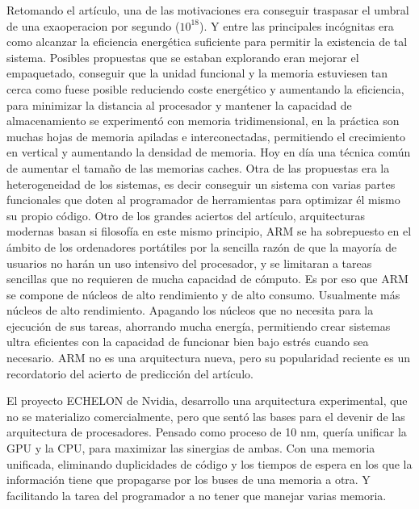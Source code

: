 \documentclass[12pt,a4paper,twoside,openright]{report}
\begin{document}
Retomando el artículo, una de las motivaciones era conseguir traspasar el umbral de una exaoperacion por segundo ($10^{18}$). Y entre las principales incógnitas era como alcanzar la eficiencia energética suficiente para permitir la existencia de tal sistema.
Posibles propuestas que se estaban explorando eran mejorar el empaquetado, conseguir que la unidad funcional y la memoria estuviesen tan cerca como fuese posible reduciendo coste energético y aumentando la eficiencia, para minimizar la distancia al procesador y mantener la capacidad de almacenamiento se experimentó con memoria tridimensional, en la práctica son muchas hojas de memoria apiladas e interconectadas, permitiendo el crecimiento en vertical y aumentando la densidad de memoria. Hoy en día una técnica común de aumentar el tamaño de las memorias caches.
Otra de las propuestas era la heterogeneidad de los sistemas, es decir conseguir un sistema con varias partes funcionales que doten al programador de herramientas para optimizar él mismo su propio código. Otro de los grandes aciertos del artículo, arquitecturas modernas basan si filosofía en este mismo principio, ARM se ha sobrepuesto en el ámbito de los ordenadores portátiles por la sencilla razón de que la mayoría de usuarios no harán un uso intensivo del procesador, y se limitaran a tareas sencillas que no requieren de mucha capacidad de cómputo. Es por eso que ARM se compone de núcleos de alto rendimiento y de alto consumo. Usualmente más núcleos de alto rendimiento. Apagando los núcleos que no necesita para la ejecución de sus tareas, ahorrando mucha energía, permitiendo crear sistemas ultra eficientes con la capacidad de funcionar bien bajo estrés cuando sea necesario. ARM no es una arquitectura nueva, pero su popularidad reciente es un recordatorio del acierto de predicción del artículo.

\medskip

El proyecto ECHELON de Nvidia, desarrollo una arquitectura experimental, que no se materializo comercialmente, pero que sentó las bases para el devenir de las arquitectura de procesadores.
Pensado como proceso de 10 nm, quería unificar la GPU y la CPU, para maximizar las sinergias de ambas. Con una memoria unificada, eliminando duplicidades de código y los tiempos de espera en los que la información tiene que propagarse por los buses de una memoria a otra. Y facilitando la tarea del programador a no tener que manejar varias memoria.

\medskip
\end{document}
